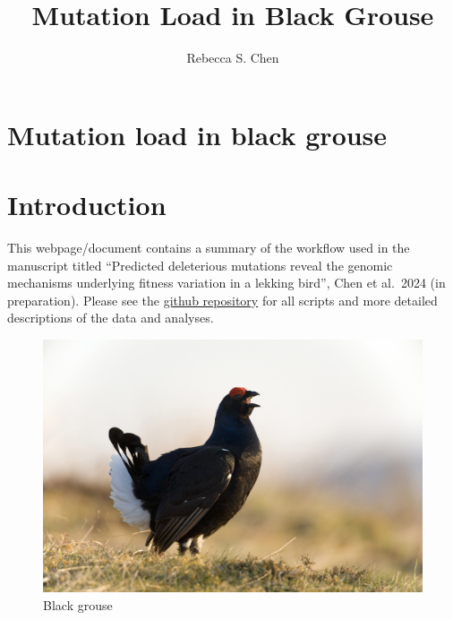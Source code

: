 \documentclass[
  letterpaper,
  DIV=11,
  numbers=noendperiod]{scrreprt}
\title{Mutation Load in Black Grouse}
\author{Rebecca S. Chen}
\date{}
\renewcommand*\contentsname{Table of contents}
\newcommand\contentsname{Table of contents}
\begin{document}
\maketitle
\ifdefined\Shaded\renewenvironment{Shaded}{\begin{tcolorbox}[boxrule=0pt, interior hidden, borderline west={3pt}{0pt}{shadecolor}, sharp corners, enhanced, frame hidden, breakable]}{\end{tcolorbox}}\fi

\renewcommand*\contentsname{Table of contents}
{
\hypersetup{linkcolor=}
\setcounter{tocdepth}{1}
\tableofcontents
}

\hypertarget{mutation-load-in-black-grouse}{%
\chapter{Mutation load in black
grouse}\label{mutation-load-in-black-grouse}}


\hypertarget{introduction}{%
\chapter{Introduction}\label{introduction}}

This webpage/document contains a summary of the workflow used in the
manuscript titled ``Predicted deleterious mutations reveal the genomic
mechanisms underlying fitness variation in a lekking bird'', Chen et
al.~2024 (in preparation). Please see the
\href{https://github.com/rshuhuachen/ms_load_grouse}{github repository}
for all scripts and more detailed descriptions of the data and analyses.

\begin{figure}

{\centering \includegraphics{plots/img/grouse.jpeg}

}

\caption{Black grouse}

\end{figure}
\end{document}
